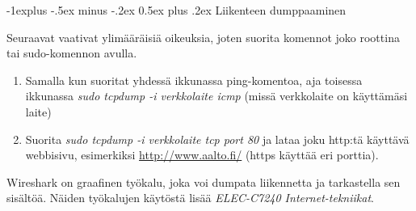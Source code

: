 \documentclass[12pt,portrait,a4]{article}
\makeatletter
\renewcommand{\subsection}{\@startsection{subsection}{2}{0mm}%
                                {-1explus -.5ex minus -.2ex}%
                                {0.5ex plus .2ex}%
                                {\normalfont\normalsize\bfseries}}
\makeatother
\begin{document}
\subsection{Liikenteen dumppaaminen}

Seuraavat vaativat ylimääräisiä oikeuksia, joten suorita komennot joko
roottina tai sudo-komennon avulla.
\begin{enumerate}
\item Samalla kun suoritat yhdessä ikkunassa ping-komentoa, aja toisessa ikkunassa
\emph{sudo tcpdump -i verkkolaite icmp} (missä verkkolaite on käyttämäsi laite)
\item Suorita \emph{sudo tcpdump -i verkkolaite tcp port 80} ja lataa joku http:tä
käyttävä webbisivu, esimerkiksi \url{http://www.aalto.fi/} (https käyttää eri porttia).
\end{enumerate}

Wireshark on graafinen työkalu, joka voi dumpata liikennetta ja tarkastella
sen sisältöä.  Näiden työkalujen käytöstä lisää \emph{ELEC-C7240 Internet-tekniikat}.
\end{document}
